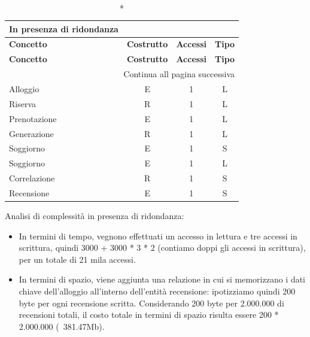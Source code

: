 \small
\setlength\extrarowheight{2pt}
\begin{longtable}{|lccc|}
    \caption*{In presenza di ridondanza}                                             \\

    \hline \textbf{Concetto} & \textbf{Costrutto} & \textbf{Accessi} & \textbf{Tipo} \\\hline
    \endfirsthead

    \hline \textbf{Concetto} & \textbf{Costrutto} & \textbf{Accessi} & \textbf{Tipo} \\\hline
    \endhead

    \hline \multicolumn{4}{|r|}{{Continua all pagina successiva}}                    \\\hline
    \endfoot

    \hline
    \endlastfoot
    Alloggio                 & E                  & 1                & L             \\%
    Riserva                  & R                  & 1                & L             \\%
    Prenotazione             & E                  & 1                & L             \\%
    Generazione              & R                  & 1                & L             \\%
    Soggiorno                & E                  & 1                & S             \\%
    Soggiorno                & E                  & 1                & L             \\%
    Correlazione             & R                  & 1                & S             \\%
    Recensione               & E                  & 1                & S             \\%
\end{longtable}
\normalsize

Analisi di complessità in presenza di ridondanza:
\begin{itemize}
    \item In termini di tempo, vegnono effettuati un accesso in lettura e tre accessi in scrittura, quindi 3000 + 3000 * 3 * 2 (contiamo doppi gli accessi in scrittura), per un totale di 21 mila accessi.
    \item In termini di spazio, viene aggiunta una relazione in cui si memorizzano i dati chiave dell'alloggio all'interno dell'entità recensione: ipotizziamo quindi 200 byte per ogni recensione scritta.
          Considerando 200 byte per 2.000.000 di recensioni totali, il costo totale in termini di spazio risulta essere 200 * 2.000.000 (~381.47Mb).
\end{itemize}

